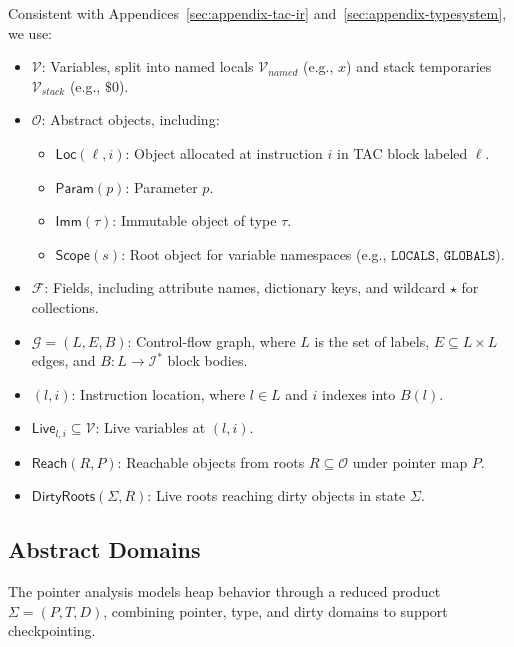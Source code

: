 Consistent with Appendices~\ref{sec:appendix-tac-ir} and~\ref{sec:appendix-typesystem}, we use:
\begin{itemize}
    \item $\mathcal{V}$: Variables, split into named locals $\mathcal{V}_{\mathit{named}}$ (e.g., $x$) and stack temporaries $\mathcal{V}_{\mathit{stack}}$ (e.g., $\$0$).
    \item $\mathcal{O}$: Abstract objects, including:
    \begin{itemize}
        \item $\mathsf{Loc}(\ell,i)$: Object allocated at instruction $i$ in TAC block labeled $\ell$.
        \item $\mathsf{Param}(p)$: Parameter $p$.
        \item $\mathsf{Imm}(\tau)$: Immutable object of type $\tau$.
        \item $\mathsf{Scope}(s)$: Root object for variable namespaces (e.g., $\mathtt{LOCALS}$, $\mathtt{GLOBALS}$).
    \end{itemize}
    \item $\mathcal{F}$: Fields, including attribute names, dictionary keys, and wildcard $\star$ for collections.
    \item $\mathcal{G} = (L, E, B)$: Control-flow graph, where $L$ is the set of labels, $E \subseteq L \times L$ edges, and $B: L \to \mathcal{I}^*$ block bodies.
    \item $(l, i)$: Instruction location, where $l \in L$ and $i$ indexes into $B(l)$.
    \item $\mathsf{Live}_{l,i} \subseteq \mathcal{V}$: Live variables at $(l,i)$.
    \item $\mathsf{Reach}(R, P)$: Reachable objects from roots $R \subseteq \mathcal{O}$ under pointer map $P$.
    \item $\mathsf{DirtyRoots}(\Sigma, R)$: Live roots reaching dirty objects in state $\Sigma$.
\end{itemize}

\subsection{Abstract Domains}

The pointer analysis models heap behavior through a reduced product $\Sigma = (P, T, D)$, combining pointer, type, and dirty domains to support checkpointing.

